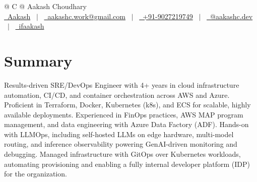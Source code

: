 \documentclass[a4paper,12pt]{article}
\begin{document}
\pagestyle{empty}



\begin{tabularx}{\linewidth}{@{} C @{}}
\Huge{Aakash Choudhary} \\[7.5pt]
\small
\href{https://in.linkedin.com/in/aakash-choudhary-a8b999192}{\raisebox{-0.05\height}\faLinkedin\ Aakash} \ $|$ \
\href{mailto:aakashc.work@gmail.com}{\raisebox{-0.05\height}\faEnvelope\ aakashc.work@gmail.com} \ $|$ \
\href{tel:+91-9027219749}{\raisebox{-0.05\height}\faMobile\ +91-9027219749} \ $|$ \
\href{https://medium.com/@aakashc.dev}{\raisebox{-0.05\height}\faMedium\ @aakashc.dev} \ $|$ \
\href{https://github.com/ifaakash}{\raisebox{-0.05\height}\faGithub\ ifaakash} \\
\end{tabularx}
\section{Summary}
Results-driven SRE/DevOps Engineer with 4+ years in cloud infrastructure automation, CI/CD, and container orchestration across AWS and Azure. Proficient in Terraform, Docker, Kubernetes (k8s), and ECS for scalable, highly available deployments. Experienced in FinOps practices, AWS MAP program management, and data engineering with Azure Data Factory (ADF). Hands-on with LLMOps, including self-hosted LLMs on edge hardware, multi-model routing, and inference observability powering GenAI-driven monitoring and debugging. Managed infrastructure with GitOps over Kubernetes workloads, automating provisioning and enabling a fully internal developer platform (IDP) for the organization.
\end{document}
